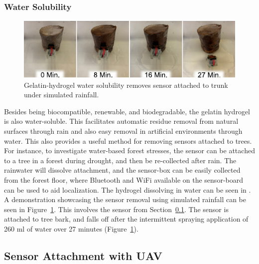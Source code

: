 \subsubsection{Water Solubility}
\begin{figure}
  \includegraphics[width=\linewidth]{figures/fig-water-solubility/fig-water-solubility.pdf}
  \caption{Gelatin-hydrogel water solubility removes sensor attached to trunk under simulated rainfall.}
  \label{fig:fig-water-solubility}
\end{figure}
Besides being biocompatible, renewable, and biodegradable, the gelatin hydrogel is also water-soluble. This facilitates automatic residue removal from natural surfaces through rain and also easy removal in artificial environments through water. This also provides a useful method for removing sensors attached to trees. For instance, to investigate water-based forest stresses, the sensor can be attached to a tree in a forest during drought, and then be re-collected after rain. The rainwater will dissolve attachment, and the sensor-box can be easily collected from the forest floor, where Bluetooth and WiFi available on the sensor-board can be used to aid localization. 
The hydrogel dissolving in water can be seen in \cite{Geckeler2023b}. A demonstration showcasing the sensor removal using simulated rainfall can be seen in Figure~\ref{fig:fig-water-solubility}. This involves the sensor from Section~\ref{subsec:sensor_attachment}. The sensor is attached to tree bark, and falls off after the intermittent spraying application of 260 ml of water over 27 minutes (Figure~\ref{fig:fig-water-solubility}). 




\subsection{Sensor Attachment with UAV}
\label{subsec:sensor_attachment}

